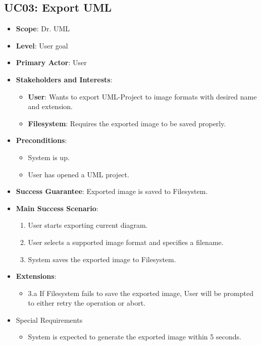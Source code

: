 \documentclass[12pt]{article}
\begin{document}
    \subsection{UC03: Export UML}
    \begin{itemize}
        \item \textbf{Scope}: Dr. UML
        \item \textbf{Level}: User goal
        \item \textbf{Primary Actor}: User
        \item \textbf{Stakeholders and Interests}:
        \begin{itemize}
            \item \textbf{User}: Wants to export UML-Project to image formats with desired name and extension.
            \item \textbf{Filesystem}: Requires the exported image to be saved properly.
        \end{itemize}
        \item \textbf{Preconditions}:
        \begin{itemize}
            \item System is up.
            \item User has opened a UML project.
        \end{itemize}
        \item \textbf{Success Guarantee}: Exported image is saved to Filesystem.
        \item \textbf{Main Success Scenario}:
        \begin{enumerate}
            \item User starts exporting current diagram.
            \item User selects a supported image format and specifies a filename.
            \item System saves the exported image to Filesystem.
        \end{enumerate}
        \item \textbf{Extensions}:
        \begin{itemize}
            \item 3.a If Filesystem fails to save the exported image, User will be prompted to either retry the operation or abort.
        \end{itemize}
        \item Special Requirements
        \begin{itemize}
            \item System is expected to generate the exported image within 5 seconds.

\end{itemize}
\end{itemize}
\end{document}
